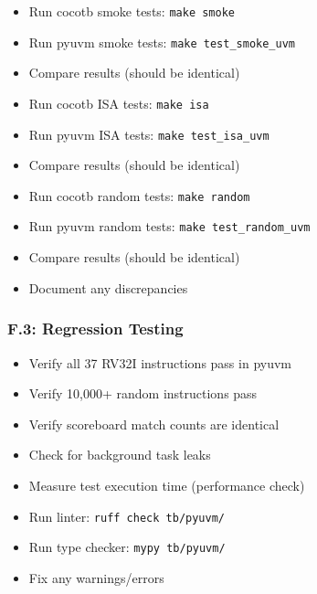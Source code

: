 \begin{record}

\begin{itemize}
\tightlist
\item[$\square$]
  Run cocotb smoke tests: \texttt{make\ smoke}
\item[$\square$]
  Run pyuvm smoke tests:
  \texttt{make\ test\_\allowbreak{}smoke\_\allowbreak{}uvm}
\item[$\square$]
  Compare results (should be identical)
\item[$\square$]
  Run cocotb ISA tests: \texttt{make\ isa}
\item[$\square$]
  Run pyuvm ISA tests:
  \texttt{make\ test\_\allowbreak{}isa\_\allowbreak{}uvm}
\item[$\square$]
  Compare results (should be identical)
\item[$\square$]
  Run cocotb random tests: \texttt{make\ random}
\item[$\square$]
  Run pyuvm random tests:
  \texttt{make\ test\_\allowbreak{}random\_\allowbreak{}uvm}
\item[$\square$]
  Compare results (should be identical)
\item[$\square$]
  Document any discrepancies
\end{itemize}

\end{record}

\subsubsection{F.3: Regression Testing}\label{cr:status:pyuvm-migration:f3-regression-testing}

\begin{record}

\begin{itemize}
\tightlist
\item[$\square$]
  Verify all 37 RV32I instructions pass in pyuvm
\item[$\square$]
  Verify 10,000+ random instructions pass
\item[$\square$]
  Verify scoreboard match counts are identical
\item[$\square$]
  Check for background task leaks
\item[$\square$]
  Measure test execution time (performance check)
\item[$\square$]
  Run linter: \texttt{ruff\ check\ tb/\allowbreak{}pyuvm/\allowbreak{}}
\item[$\square$]
  Run type checker: \texttt{mypy\ tb/\allowbreak{}pyuvm/\allowbreak{}}
\item[$\square$]
  Fix any warnings/\allowbreak{}errors
\end{itemize}

\end{record}

